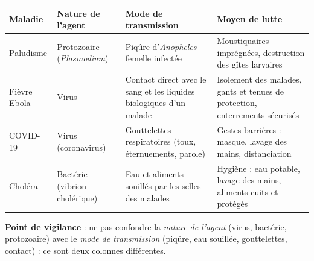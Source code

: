 \documentclass[11pt]{article}
\begin{document}
\begin{corrige}
\begin{center}
\begin{tabularx}{\linewidth}{|l|X|X|X|}
\hline
\rowcolor{popblueL} Maladie & Nature de l'agent & Mode de transmission & Moyen de lutte \\
\hline
Paludisme & Protozoaire (\emph{Plasmodium}) & Piqûre d'\emph{Anopheles} femelle infectée & Moustiquaires imprégnées, destruction des gîtes larvaires \\
\hline
Fièvre Ebola & Virus & Contact direct avec le sang et les liquides biologiques d'un malade & Isolement des malades, gants et tenues de protection, enterrements sécurisés \\
\hline
COVID-19 & Virus (coronavirus) & Gouttelettes respiratoires (toux, éternuements, parole) & Gestes barrières : masque, lavage des mains, distanciation \\
\hline
Choléra & Bactérie (vibrion cholérique) & Eau et aliments souillés par les selles des malades & Hygiène : eau potable, lavage des mains, aliments cuits et protégés \\
\hline
\end{tabularx}
\end{center}
\textbf{Point de vigilance} : ne pas confondre la \emph{nature de l'agent} (virus, bactérie, protozoaire) avec le \emph{mode de transmission} (piqûre, eau souillée, gouttelettes, contact) : ce sont deux colonnes différentes.
\end{corrige}
\end{document}
